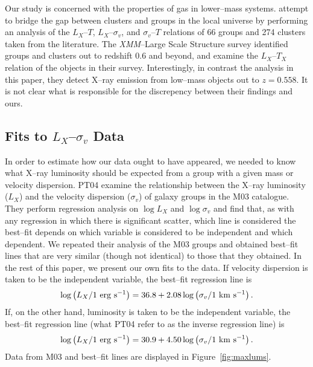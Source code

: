 \documentclass[12pt,preprint]{aastex}
\begin{document}
Our study is concerned with the properties of gas in lower--mass systems.
\citet{xue+wu2000} attempt to bridge the gap between clusters and groups in
the local universe by performing an analysis of the $L_X$--$T$,
$L_X$--$\sigma_v$, and $\sigma_v$--$T$ relations of 66 groups and 274 clusters
taken from the literature.
The \textsl{XMM}--Large Scale Structure survey identified groups and clusters
out to redshift 0.6 and beyond, and \citet{willis_et_al2005} examine the
$L_X$--$T_X$ relation of the objects in their survey.  Interestingly, in
contrast the analysis in this paper, they detect X--ray emission from low--mass
objects out to $z=0.558$.  It is not clear what is responsible for the
discrepency between their findings and ours.

\subsection{Fits to $L_X$--$\sigma_v$ Data}
\label{subsec:fits}
In order to estimate how our data ought to have appeared, we needed to know
what X--ray luminosity should be expected from a group with a given mass or
velocity dispersion.  PT04 examine the relationship between the X--ray
luminosity ($L_X$) and the velocity dispersion ($\sigma_v$) of galaxy groups in
the M03 catalogue.  They perform regression analysis on
$\log L_X$ and $\log \sigma_v$ and find that, as with any regression in
which there is significant scatter, which line is considered the best--fit
depends on which variable is considered to be independent and which dependent.
We repeated their analysis of the M03 groups and obtained best--fit lines that
are very similar (though not identical) to those that they obtained.  In the
rest of this paper, we present our own fits to the data.
If velocity dispersion is taken to be the independent variable, the best--fit
regression line is
\begin{equation}
\label{eq:M03D}
\log \left(L_X / 1 {\rm~erg~s^{-1}}\right) = 36.8 + 2.08 \log \left( \sigma_v / 1 {\rm~km~s^{-1}} \right).
\end{equation}
If, on the other hand, luminosity is taken to be the independent variable,
the best--fit regression line (what PT04 refer to as the inverse regression
line) is
\begin{equation}
\label{eq:M03I}
\log \left(L_X / 1 {\rm~erg~s^{-1}}\right) = 30.9 + 4.50 \log \left( \sigma_v / 1 {\rm~km~s^{-1}} \right).
\end{equation}
Data from M03 and best--fit lines are displayed in Figure~\ref{fig:maxlums}.
\end{document}
